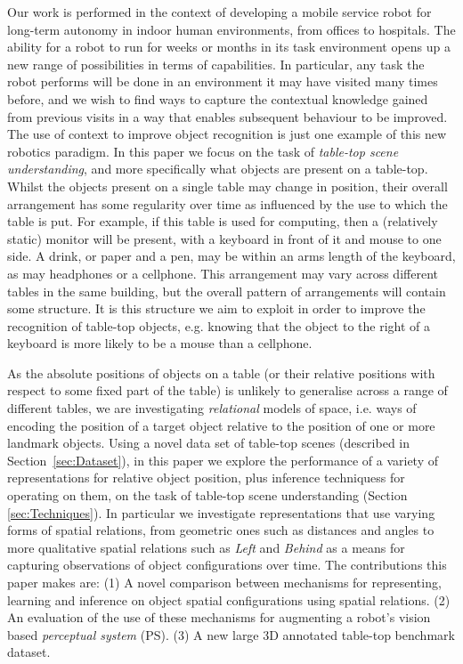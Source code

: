\documentclass[letterpaper]{article}
\begin{document}
Our work is performed in the context of developing a mobile service robot for long-term autonomy in indoor human environments, from offices to hospitals. The ability for a robot to run for weeks or months in its task environment opens up a new range of possibilities in terms of capabilities. In particular, any task the robot performs will be done in an environment it may have visited many times before, and we wish to find ways to capture the contextual knowledge gained from previous visits in a way that enables subsequent behaviour to be improved. The use of context to improve object recognition is just one example of this new robotics paradigm. In this paper we focus on the task of \emph{table-top scene understanding}, and more specifically what objects are present on a table-top. Whilst the objects present on a single table may change in position, their overall arrangement has some regularity over time as influenced by the use to which the table is put. For example, if this table is used for computing, then a (relatively static) monitor will be present, with a keyboard in front of it and mouse to one side. A drink, or paper and a pen, may be within an arms length of the keyboard, as may headphones or a cellphone. This arrangement may vary across different tables in the same building, but the overall pattern of arrangements will contain some structure. It is this structure we aim to exploit in order to improve the recognition of table-top objects, e.g. knowing that the object to the right of a keyboard is more likely to be a mouse than a cellphone. 

As the absolute positions of objects on a table (or their relative positions with respect to some fixed part of the table) is unlikely to generalise across a range of different tables, we are investigating \emph{relational} models of space, i.e. ways of encoding the position of a target object relative to the position of one or more landmark objects. Using a novel data set of table-top scenes (described in Section~\ref{sec:Dataset}), in this paper we explore the performance of a variety of representations for relative object position, plus inference techniquess for operating on them, on the task of table-top scene understanding (Section \ref{sec:Techniques}). In particular we investigate representations that use varying forms of spatial relations, from geometric ones such as distances and angles to more qualitative spatial relations such as \textit{Left} and \textit{Behind} as a means for capturing observations of object configurations over time. The contributions this paper makes are: (1) A novel comparison between mechanisms for representing, learning and inference on object spatial configurations using spatial relations. (2) An evaluation of the use of these mechanisms for augmenting a robot's vision based \textit{perceptual system} (PS). (3) A new large 3D annotated table-top benchmark dataset.
\end{document}
